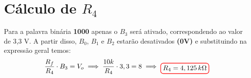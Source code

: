 \documentclass[12pt,openany,oneside,a4paper]{abntex2}
\begin{document}
\section{Cálculo de $R_4$}
Para a palavra binária \textbf{1000} apenas o $B_{3}$ será ativado, correspondendo ao valor de 3{,}3 V. A partir disso, $B_{0}$, $B_{1}$ e $B_{2}$ estarão desativados \textbf{(0V)} e substituindo na expressão geral temos:
\\
\[
\frac{R_{f}}{R_{4}} \cdot B_{3} = V_{o} \implies \frac{10k}{R_{4}} \cdot 3,3 = 8 \implies \tikz[baseline]{\node[draw=red, thick, rounded corners] {$R_{4} = 4,125 \text\,{k}\Omega$};}
\]
\end{document}
